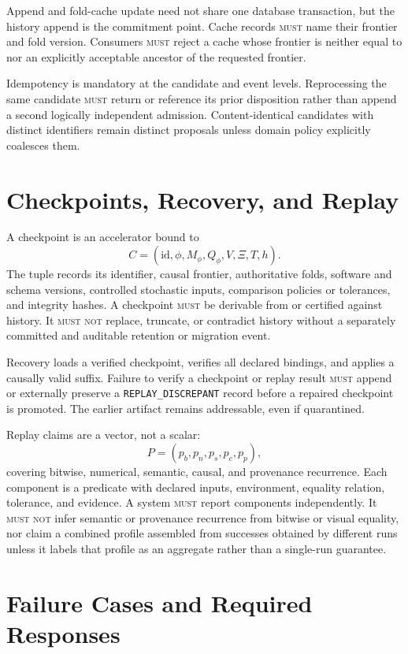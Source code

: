 \documentclass[11pt]{article}
\newcommand{\MUST}{\textsc{must}}
\newcommand{\MUSTNOT}{\textsc{must not}}
\begin{document}
Append and fold-cache update need not share one database transaction, but the history append is the commitment point. Cache records \MUST{} name their frontier and fold version. Consumers \MUST{} reject a cache whose frontier is neither equal to nor an explicitly acceptable ancestor of the requested frontier.

Idempotency is mandatory at the candidate and event levels. Reprocessing the same candidate \MUST{} return or reference its prior disposition rather than append a second logically independent admission. Content-identical candidates with distinct identifiers remain distinct proposals unless domain policy explicitly coalesces them.

\section{Checkpoints, Recovery, and Replay}
\label{sec:checkpoints-section}

A checkpoint is an accelerator bound to
\[
C=(\text{id},\phi,M_{\phi},Q_{\phi},V,\Xi,T,h).
\]
The tuple records its identifier, causal frontier, authoritative folds, software and schema versions, controlled stochastic inputs, comparison policies or tolerances, and integrity hashes. A checkpoint \MUST{} be derivable from or certified against history. It \MUSTNOT{} replace, truncate, or contradict history without a separately committed and auditable retention or migration event.

Recovery loads a verified checkpoint, verifies all declared bindings, and applies a causally valid suffix. Failure to verify a checkpoint or replay result \MUST{} append or externally preserve a \texttt{REPLAY\_DISCREPANT} record before a repaired checkpoint is promoted. The earlier artifact remains addressable, even if quarantined.

Replay claims are a vector, not a scalar:
\[
P=(p_b,p_n,p_s,p_c,p_p),
\]
covering bitwise, numerical, semantic, causal, and provenance recurrence. Each component is a predicate with declared inputs, environment, equality relation, tolerance, and evidence. A system \MUST{} report components independently. It \MUSTNOT{} infer semantic or provenance recurrence from bitwise or visual equality, nor claim a combined profile assembled from successes obtained by different runs unless it labels that profile as an aggregate rather than a single-run guarantee.

\section{Failure Cases and Required Responses}
\end{document}
